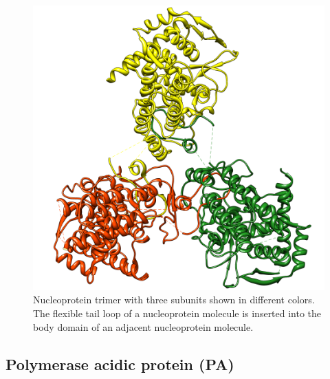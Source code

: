 \begin{figure}
\centering
\includegraphics[width=\linewidth]{../influenza/2IQH.png}
\caption{Nucleoprotein trimer with three subunits shown in different colors. The flexible tail loop of a nucleoprotein molecule is inserted into the body domain of an adjacent nucleoprotein molecule.}
\label{influenza:2IQH}
\end{figure}

\subsection{Polymerase acidic protein (PA)}

